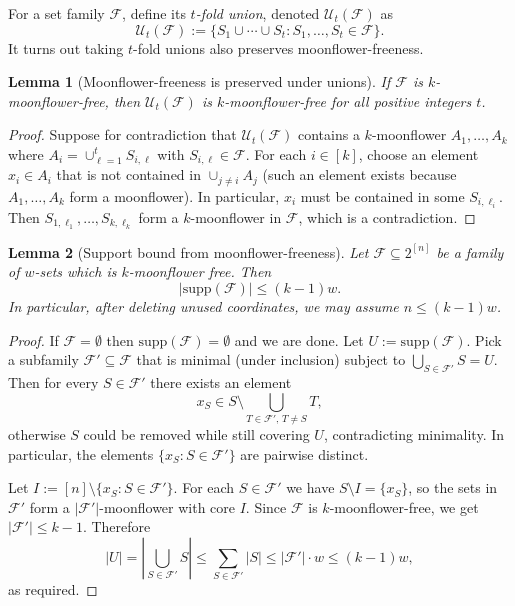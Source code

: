 \documentclass{article}
\newtheorem{lemma}[lemma]{Lemma}
\newcommand{\<}{\langle}
\renewcommand{\>}{\rangle}
\newcommand{\calF}{\mathcal{F}}
\newcommand{\calU}{\mathcal{U}}
\newcommand{\supp}{\mathrm{supp}}
\begin{document}
For a set family $\calF$, define its \emph{$t$-fold union}, denoted $\calU_t (\calF)$ as
\[
\calU_t (\calF) := \{S_1 \cup \cdots \cup S_t: S_1,\ldots,S_t \in \calF\}.
\]
It turns out taking $t$-fold unions also preserves moonflower-freeness.

\begin{lemma}[Moonflower-freeness is preserved under unions]\label{lem:moonflower_free_preserved_under_union}
    If $\calF$ is $k$-moonflower-free, then $\calU_t (\calF)$ is $k$-moonflower-free for all positive integers $t$.
\end{lemma}
\begin{proof}
    Suppose for contradiction that $\calU_t (\calF)$ contains a $k$-moonflower $A_1,\ldots,A_k$ where $A_i = \cup_{\ell=1}^t S_{i, \ell}$ with $S_{i, \ell} \in \calF$. For each $i \in [k]$, choose an element $x_i \in A_i$ that is not contained in $\cup_{j \ne i} A_j$ (such an element exists because $A_1,\ldots,A_k$ form a moonflower). In particular, $x_i$ must be contained in some $S_{i, \ell_i}$. Then $S_{1, \ell_1},\ldots,S_{k, \ell_k}$ form a $k$-moonflower in $\calF$, which is a contradiction. 
\end{proof}

\begin{lemma}[Support bound from moonflower-freeness]\label{lem:moonflower_free_family_have_small_support}Let $\calF \subseteq 2^{[n]}$ be a family of $w$-sets which is $k$-moonflower free. Then
\[
|\supp (\calF)| \leq (k-1)w.
\]
In particular, after deleting unused coordinates, we may assume $n \leq (k-1)w$. 
\end{lemma}

\begin{proof}
If $\mathcal F=\emptyset$ then $\supp(\mathcal F)=\emptyset$ and we are done.  Let $U:=\supp(\mathcal F)$.
Pick a subfamily $\mathcal F'\subseteq \mathcal F$ that is minimal (under inclusion) subject to
$\bigcup_{S\in\mathcal F'} S = U$.
Then for every $S\in\mathcal F'$ there exists an element
\[
x_S \in S\setminus \bigcup_{T\in\mathcal F',\,T\neq S} T,
\]
otherwise $S$ could be removed while still covering $U$, contradicting minimality.
In particular, the elements $\{x_S: S\in\mathcal F'\}$ are pairwise distinct.

Let $I := [n]\setminus \{x_S : S\in\mathcal F'\}$.  For each $S\in\mathcal F'$ we have
$S\setminus I = \{x_S\}$, so the sets in $\mathcal F'$ form a $|\mathcal F'|$-moonflower with core $I$.
Since $\mathcal F$ is $k$-moonflower-free, we get $|\mathcal F'|\le k-1$. Therefore
\[
|U|=\left|\bigcup_{S\in\mathcal F'} S\right|\le \sum_{S\in\mathcal F'} |S|
\le |\mathcal F'|\cdot w \le (k-1)w,
\]
as required.
\end{proof}
\end{document}
